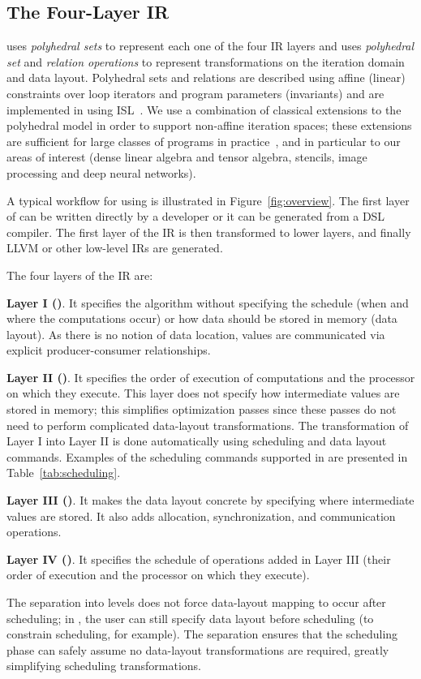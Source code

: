 \vspace{-0.3cm}
\subsection{The Four-Layer IR}

\framework{} uses \emph{polyhedral sets} to represent each one of the four IR layers and uses \emph{polyhedral set} and \emph{relation operations} to represent transformations on the iteration domain and data layout.  Polyhedral sets and relations are described using affine (linear) constraints over loop iterators and program parameters (invariants) and are implemented in \framework using ISL~\cite{verdoolaege_isl:_2010}.  We use a combination of classical extensions to the polyhedral model in order to support non-affine iteration spaces; these extensions are sufficient for large classes of programs in practice~\cite{benabderrahmane_polyhedral_2010,pencil}, and in particular to our areas of interest (dense linear algebra and tensor algebra, stencils, image processing and deep neural networks).

A typical workflow for using \framework is illustrated in Figure~\ref{fig:overview}.  The first layer of \framework{} can be written directly by a developer or it can be generated from a DSL compiler.  The first layer of the IR is then transformed to lower layers, and finally LLVM or other low-level IRs are generated.

The four layers of the \framework IR are:

\textbf{Layer I (\Layerone)}.
It specifies the algorithm without specifying the schedule (when and where the computations occur) or how data should be stored in memory (data layout). As there is no notion of data location, values are communicated via explicit producer-consumer relationships.

\textbf{Layer II (\Layertwo)}.
It specifies the order of execution of computations and the processor on which they execute.  This layer does not specify how intermediate values are stored in memory; this simplifies optimization passes since these passes do not need to perform complicated data-layout transformations.  The transformation of Layer I into Layer II is done automatically using scheduling and data layout commands.  Examples of the scheduling commands supported in \framework are presented in Table~\ref{tab:scheduling}.

\textbf{Layer III (\Layerthree)}.
It makes the data layout concrete by specifying where intermediate values are stored. It also adds allocation, synchronization, and communication operations.

\textbf{Layer IV (\Layerfour)}.
It specifies the schedule of operations added in Layer III (their order of execution and the processor on which they execute).

The separation into levels does not force data-layout mapping to occur after scheduling; in \framework, the user can still specify data layout before scheduling (to constrain scheduling, for example). The separation ensures that the scheduling phase can safely assume no data-layout transformations are required, greatly simplifying scheduling transformations.